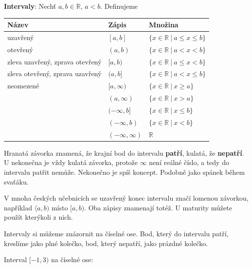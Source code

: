 \begin{definitionbox}
  \textbf{Intervaly}: Nechť $a, b\in\mathbb{R}$, $a < b$. Definujeme
  \begin{center}
    \renewcommand{\arraystretch}{1.3}
    \begin{tabular}{|l|l|l|}
      \hline
      Název & Zápis & Množina \\
      \hline
      uzavřený & $[a, b]$ & $\{x\in\mathbb{R}\ |\ a\leq x\leq b\}$ \\
      otevřený & $(a, b)$ & $\{x\in\mathbb{R}\ |\ a < x < b\}$ \\
      zleva uzavřený, zprava otevřený & $[a, b)$ & $\{x\in\mathbb{R}\ |\ a\leq x < b\}$ \\
      zleva otevřený, zprava uzavřený & $(a, b]$ & $\{x\in\mathbb{R}\ |\ a < x\leq b\}$ \\
      \hline
      neomezené & $[a, \infty)$ & $\{x\in\mathbb{R}\ |\ x\geq a\}$ \\
       & $(a, \infty)$ & $\{x\in\mathbb{R}\ |\ x > a\}$ \\
       & $(-\infty, b]$ & $\{x\in\mathbb{R}\ |\ x\leq b\}$ \\
       & $(-\infty, b)$ & $\{x\in\mathbb{R}\ |\ x < b\}$ \\
       & $(-\infty, \infty)$ & $\mathbb{R}$ \\
      \hline
    \end{tabular}
  \end{center}
  Hranatá závorka znamená, že krajní bod do intervalu \textbf{patří}, kulatá, že \textbf{nepatří}. U nekonečna je vždy kulatá závorka, protože $\infty$ není reálné číslo, a tedy do intervalu patřit nemůže. Nekonečno je spíš koncept. Podobně jako spánek během svaťáku.
\end{definitionbox}

\begin{note}
  V mnoha českých učebnicích se uzavřený konec intervalu značí lomenou závorkou, například $\langle a, b)$ místo $[a, b)$. Oba zápisy znamenají totéž. U maturity můžete použít kterýkoli z nich.
\end{note}

Intervaly si můžeme znázornit na číselné ose. Bod, který do intervalu patří, kreslíme jako plné kolečko, bod, který nepatří, jako prázdné kolečko.

\begin{example}
  Interval $[-1, 3)$ na číselné ose:
  \begin{center}
  \end{center}
\end{example}

